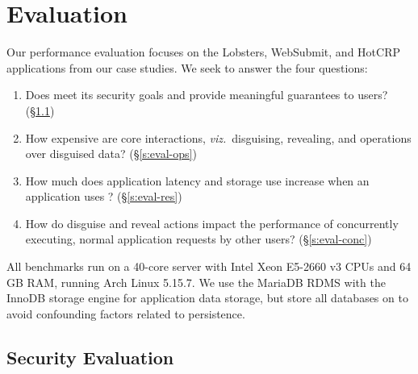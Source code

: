 \section{Evaluation}
\label{s:eval}

%
Our performance evaluation focuses on the Lobsters, WebSubmit, and HotCRP applications
from our case studies.
%
We seek to answer the four questions:
%
\begin{enumerate}[nosep]
 \item Does \sys meet its security goals and provide meaningful guarantees to users?
   (\S\ref{s:eval-security})
 \item How expensive are core \sys interactions, \emph{viz.}\ disguising, revealing, and
   operations over disguised data? (\S\ref{s:eval-ops})
 \item How much does application latency and storage use increase when an application
   uses \sys? (\S\ref{s:eval-res})
 \item How do disguise and reveal actions impact the performance of concurrently executing,
   normal application requests by other users? (\S\ref{s:eval-conc})
\end{enumerate}
%
All benchmarks run on a 40-core server with Intel Xeon E5-2660 v3 CPUs and 64 GB RAM,
running Arch Linux 5.15.7.
%
We use the MariaDB RDMS with the InnoDB storage engine for application data storage, but
store all databases on  to avoid confounding factors related to persistence.
%

\subsection{Security Evaluation}
\label{s:eval-security}

